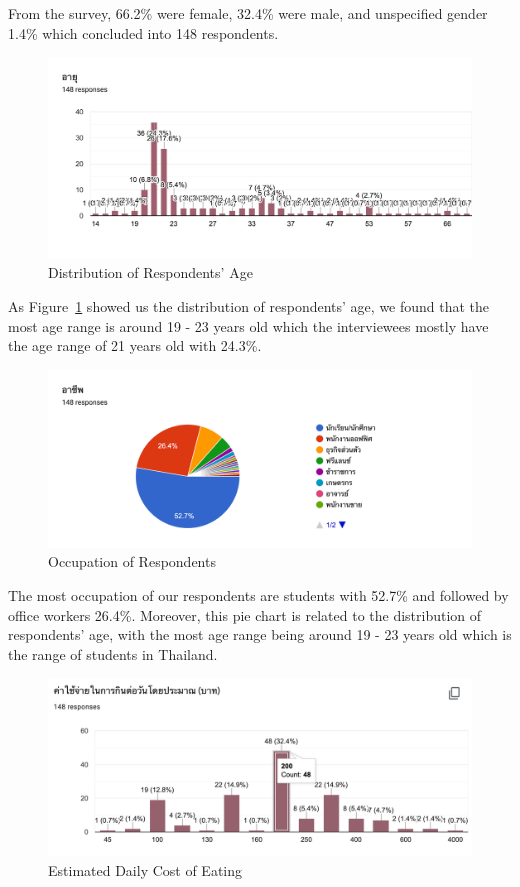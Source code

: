 \documentclass[12pt,oneside,openright,a4paper]{cpe-english-project}
\begin{document}
From the survey, 66.2\% were female, 32.4\% were male, and unspecified gender 1.4\% which concluded into 148 respondents.

\begin{figure}[H]\centering
\includegraphics[width=350pt]{./images/A1DistributionofRespondentsAge.png}
\caption{Distribution of Respondents’ Age}\label{fig:A1DistributionofRespondentsAge}
\end{figure}

As Figure~\ref{fig:A1DistributionofRespondentsAge} showed us the distribution of respondents’ age, we found that the most age range is around 19 - 23 years old which the interviewees mostly have the age range of 21 years old with 24.3\%.


\begin{figure}[H]\centering
\includegraphics[width=350pt]{./images/A1OccupationofRespondents.png}
\caption{Occupation of Respondents}\label{fig:A1OccupationofRespondents}
\end{figure}

The most occupation of our respondents are students with 52.7\% and followed by office workers 26.4\%. Moreover, this pie chart is related to the distribution of respondents’ age, with the most age range being around 19 - 23 years old which is the range of students in Thailand.

\begin{figure}[H]\centering
\includegraphics[width=350pt]{./images/A1EstimatedDailyCostofEating.png}
\caption{Estimated Daily Cost of Eating}\label{fig:A1EstimatedDailyCostofEating}
\end{figure}
\end{document}

